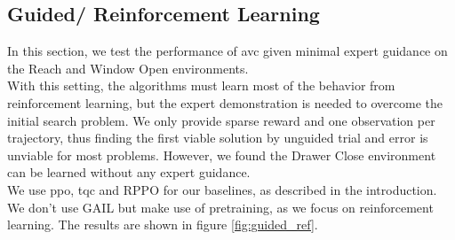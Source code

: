 \subsection{Guided/ Reinforcement Learning}
\label{sec:g_ref_ler}
In this section, we test the performance of \ac{avc} given minimal expert guidance on the Reach and Window Open environments. \\
With this setting, the algorithms must learn most of the behavior from reinforcement learning, but the expert
demonstration is needed to overcome the initial search problem. We only provide sparse reward and one observation per trajectory, thus finding the first viable solution by unguided
trial and error is unviable for most problems. However, we found the Drawer Close environment can be learned without any expert guidance.\\

We use \ac{ppo}, \ac{tqc} and RPPO for our baselines, as described in the introduction. We don't use GAIL but make use of pretraining, as we focus on reinforcement learning. The results
are shown in figure \ref{fig:guided_ref}.\\

